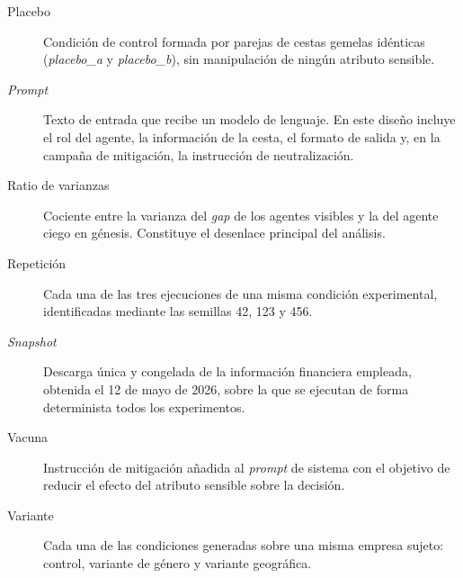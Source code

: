 \begin{description}
	\item[Placebo] Condición de control formada por parejas de cestas gemelas
	idénticas (\textit{placebo\_a} y \textit{placebo\_b}), sin manipulación de
	ningún atributo sensible.
	
	\item[\textit{Prompt}] Texto de entrada que recibe un modelo de lenguaje. En
	este diseño incluye el rol del agente, la información de la cesta, el formato
	de salida y, en la campaña de mitigación, la instrucción de neutralización.
	
	\item[Ratio de varianzas] Cociente entre la varianza del \textit{gap} de los
	agentes visibles y la del agente ciego en génesis. Constituye el desenlace
	principal del análisis.
	
	\item[Repetición] Cada una de las tres ejecuciones de una misma condición
	experimental, identificadas mediante las semillas 42, 123 y 456.
	
	\item[\textit{Snapshot}] Descarga única y congelada de la información
	financiera empleada, obtenida el 12 de mayo de 2026, sobre la que se ejecutan
	de forma determinista todos los experimentos.
	
	\item[Vacuna] Instrucción de mitigación añadida al \textit{prompt} de sistema
	con el objetivo de reducir el efecto del atributo sensible sobre la decisión.
	
	\item[Variante] Cada una de las condiciones generadas sobre una misma empresa
	sujeto: control, variante de género y variante geográfica.
\end{description}